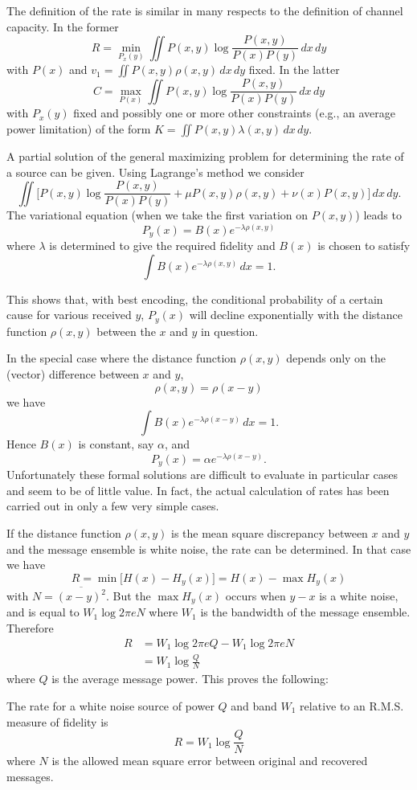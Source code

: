 The definition of the rate is similar in many respects to the definition
of channel capacity.  In the former
$$
R=\min_{P_x(y)}
\iint P(x,y)\log\frac{P(x,y)}{P(x)P(y)}\,dx\,dy
$$
with $P(x)$ and $\displaystyle v_1=\iint P(x,y)\rho(x,y)\,dx\,dy$ fixed.
In the latter
$$
C=\max_{P(x)}
\iint P(x,y)\log\frac{P(x,y)}{P(x)P(y)}\,dx\,dy
$$
with $P_x(y)$ fixed and possibly one or more other constraints (e.g., an
average power limitation) of the form $K=\iint P(x,y)\lambda(x,y)\,dx\,dy$.

A partial solution of the general maximizing problem for determining the
rate of a source can be given.  Using Lagrange's method we consider
$$
\iint\biggl[P(x,y)\log\frac{P(x,y)}{P(x)P(y)}
+\mu P(x,y)\rho(x,y)+\nu(x)P(x,y)\biggr]\,dx\,dy.
$$
The variational equation (when we take the first variation on $P(x,y)$)
leads to
$$
P_y(x)=B(x)e^{-\lambda\rho(x,y)}
$$
where $\lambda$ is determined to give the required fidelity and $B(x)$ is
chosen to satisfy
$$
\int B(x)e^{-\lambda\rho(x,y)}\,dx=1.
$$

This shows that, with best encoding, the conditional probability of a
certain cause for various received $y$, $P_y(x)$ will decline exponentially
with the distance function $\rho(x,y)$ between the $x$ and $y$ in question.

In the special case where the distance function $\rho(x,y)$ depends only on
the (vector) difference between $x$ and $y$,
$$
\rho(x,y)=\rho(x-y)
$$
we have
$$
\int B(x)e^{-\lambda\rho(x-y)}\,dx=1.
$$
Hence $B(x)$ is constant, say $\alpha$, and
$$
P_y(x)=\alpha e^{-\lambda\rho(x-y)}.
$$
Unfortunately these formal solutions are difficult to evaluate in
particular cases and seem to be of little value.  In fact, the actual
calculation of rates has been carried out in only a few very simple cases.

If the distance function $\rho(x,y)$ is the mean square discrepancy between
$x$ and $y$ and the message ensemble is white noise, the rate can be
determined.  In that case we have
$$
R=\min\bigl[H(x)-H_y(x)\bigr]=H(x)-\max H_y(x)
$$
with $N=\overline{(x-y)^2}$.  But the
$\max H_y(x)$ occurs when $y-x$ is a white noise, and is equal to
$W_1\log 2\pi e N$ where $W_1$ is the bandwidth of the message ensemble.
Therefore
\begin{align*}
R&=W_1\log 2\pi e Q - W_1\log 2\pi e N\\
	&=W_1\log\frac{Q}{N}
\end{align*}
where $Q$ is the average message power.  This proves the following:
\begin{theorem}
The rate for a white noise source of power $Q$ and band $W_1$ relative to
an R.M.S. measure of fidelity is
$$
R=W_1\log\frac{Q}{N}
$$
where $N$ is the allowed mean square error between original and recovered
messages.
\end{theorem}

